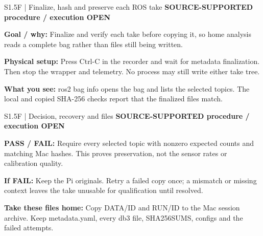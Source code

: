 \documentclass[aspectratio=169,12pt,t]{beamer}
\newcommand{\evidence}[1]{{\small\bfseries\color{teal!70!black}#1}\par\medskip}
\begin{document}
\begin{frame}{S1.5F | Finalize, hash and preserve each ROS take}
\evidence{SOURCE-SUPPORTED procedure / execution OPEN}
\textbf{Goal / why:} Finalize and verify each take before copying it, so home analysis reads a complete bag rather than files still being written.\par\medskip\textbf{Physical setup:} Press Ctrl-C in the recorder and wait for metadata finalization. Then stop the wrapper and telemetry. No process may still write either take tree.\par\medskip\textbf{What you see:} ros2 bag info opens the bag and lists the selected topics. The local and copied SHA-256 checks report that the finalized files match.
\end{frame}
\begin{frame}{S1.5F | Decision, recovery and files}
\evidence{SOURCE-SUPPORTED procedure / execution OPEN}
\textbf{PASS / FAIL:} Require every selected topic with nonzero expected counts and matching Mac hashes. This proves preservation, not the sensor rates or calibration quality.\par\medskip\textbf{If FAIL:} Keep the Pi originals. Retry a failed copy once; a mismatch or missing context leaves the take unusable for qualification until resolved.\par\medskip\textbf{Take these files home:} Copy DATA/ID and RUN/ID to the Mac session archive. Keep metadata.yaml, every db3 file, SHA256SUMS, configs and the failed attempts.
\end{frame}
\end{document}
